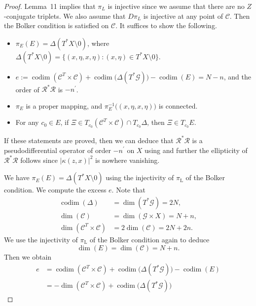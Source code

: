 \documentclass[a4paper,11pt,reqno]{amsart}
\theoremstyle{definition}
\theoremstyle{remark}
\begin{document}
\begin{proof}
Lemma~11 implies that $\pi_L$ is injective since we assume that there are no $Z$-conjugate triplets. 
We also assume that $D\pi_L$ is injective at any point of $\mathcal{C}$. Then the Bolker condition is satisfied on $\mathcal{C}$. It suffices to show the following. 
%
%
\begin{itemize}
\item 
$\pi_E(E)=\Delta(T^\ast{X}\setminus0)$, 
where 
$\Delta(T^\ast{X}\setminus0)=\{(x,\eta,x,\eta) : (x,\eta) \in T^\ast{X}\setminus0\}$. 
\item 
$e:=\operatorname{codim}(\mathcal{C}^T\times\mathcal{C})+\operatorname{codim}\bigl(\Delta(T^\ast\mathcal{G})\bigr)-\operatorname{codim}(E)=N-n$, and the order of $\mathcal{R}^\ast\mathcal{R}$ is $-n^\prime$. 
\item 
$\pi_E$ is a proper mapping, and 
$\pi_E^{-1}\bigl((x,\eta,x,\eta)\bigr)$ is connected. 
\item 
For any $c_0 \in E$, if $\Xi \in T_{c_0}(\mathcal{C}^T\times\mathcal{C}){\cap}T_{c_0}\Delta$, 
then $\Xi \in T_{c_0}E$.  
\end{itemize}
%
%
If these statements are proved, then we can deduce that $\mathcal{R}^\ast\mathcal{R}$ is a pseudodifferential operator of order $-n^\prime$ on $X$ using \cite[{Theorem~25.2.3}]{Hoermander4} and further the ellipticity of $\mathcal{R}^\ast\mathcal{R}$ follows since $\lvert\kappa(z,x)\rvert^2$ is nowhere vanishing. 
%
%
\par
%
%
We have $\pi_E(E)=\Delta(T^\ast{X}\setminus0)$ 
using the injectivity of 
$\pi_\text{L}$ of the Bolker condition. 
We compute the excess $e$. Note that 
%
%
\begin{align*}
  \operatorname{codim}(\Delta)
& =
  \dim(T^\ast\mathcal{G})=2N, 
\\
  \dim(\mathcal{C})
& =
  \dim(\mathcal{G}{\times}X)=N+n,
\\
  \dim(\mathcal{C}^T\times\mathcal{C})
& =
  2\dim(\mathcal{C})=2N+2n. 
\end{align*}
%
%
We use the injectivity of $\pi_\text{L}$ of the Bolker condition again to deduce 
%
%
$$
\dim(E)=\dim(\mathcal{C})=N+n. 
$$
%
%
Then we obtain 
%
%
\begin{align*}
  e
& =
  \operatorname{codim}(\mathcal{C}^T\times\mathcal{C})
  +
  \operatorname{codim}\bigl(\Delta(T^\ast\mathcal{G})\bigr)
  -
  \operatorname{codim}(E)
\\
& =
  -
  \operatorname{dim}(\mathcal{C}^T\times\mathcal{C})
  +
  \operatorname{codim}\bigl(\Delta(T^\ast\mathcal{G})\bigr)

\end{align*}
\end{proof}
\end{document}
